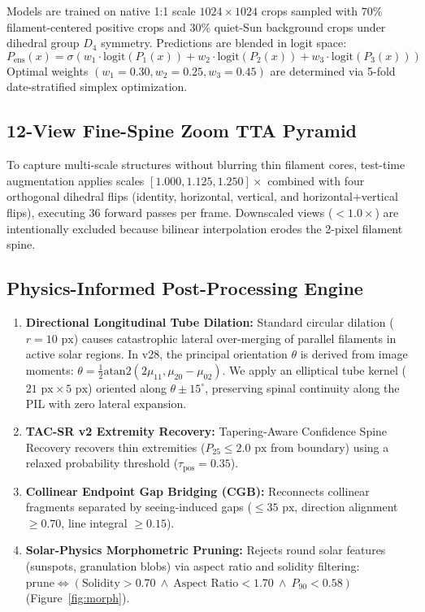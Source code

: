 \documentclass[sigconf]{acmart}
\begin{document}
Models are trained on native 1:1 scale $1024 \times 1024$ crops sampled with $70\%$ filament-centered positive crops and $30\%$ quiet-Sun background crops under dihedral group $D_4$ symmetry. Predictions are blended in logit space:
\begin{equation}
    P_{\text{ens}}(x) = \sigma\left( w_1 \cdot \mathrm{logit}(P_1(x)) + w_2 \cdot \mathrm{logit}(P_2(x)) + w_3 \cdot \mathrm{logit}(P_3(x)) \right)
\end{equation}
Optimal weights $(w_1=0.30, w_2=0.25, w_3=0.45)$ are determined via 5-fold date-stratified simplex optimization.

\subsection{12-View Fine-Spine Zoom TTA Pyramid}
To capture multi-scale structures without blurring thin filament cores, test-time augmentation applies scales $[1.000, 1.125, 1.250]\times$ combined with four orthogonal dihedral flips (identity, horizontal, vertical, and horizontal+vertical flips), executing 36 forward passes per frame. Downscaled views ($< 1.0\times$) are intentionally excluded because bilinear interpolation erodes the 2-pixel filament spine.

\subsection{Physics-Informed Post-Processing Engine}
\begin{enumerate}
    \item \textbf{Directional Longitudinal Tube Dilation:} Standard circular dilation ($r = 10\text{ px}$) causes catastrophic lateral over-merging of parallel filaments in active solar regions. In v28, the principal orientation $\theta$ is derived from image moments: $\theta = \frac{1}{2}\mathrm{atan2}(2\mu_{11}, \mu_{20} - \mu_{02})$. We apply an elliptical tube kernel ($21\text{ px} \times 5\text{ px}$) oriented along $\theta \pm 15^\circ$, preserving spinal continuity along the PIL with zero lateral expansion.
    \item \textbf{TAC-SR v2 Extremity Recovery:} Tapering-Aware Confidence Spine Recovery recovers thin extremities ($P_{25} \le 2.0\text{ px}$ from boundary) using a relaxed probability threshold ($\tau_{\text{pos}} = 0.35$).
    \item \textbf{Collinear Endpoint Gap Bridging (CGB):} Reconnects collinear fragments separated by seeing-induced gaps ($\le 35\text{ px}$, direction alignment $\ge 0.70$, line integral $\ge 0.15$).
    \item \textbf{Solar-Physics Morphometric Pruning:} Rejects round solar features (sunspots, granulation blobs) via aspect ratio and solidity filtering: $\mathrm{prune} \iff (\text{Solidity} > 0.70 \ \wedge \ \text{Aspect Ratio} < 1.70 \ \wedge \ P_{90} < 0.58)$ (Figure~\ref{fig:morph}).
\end{enumerate}
\end{document}
